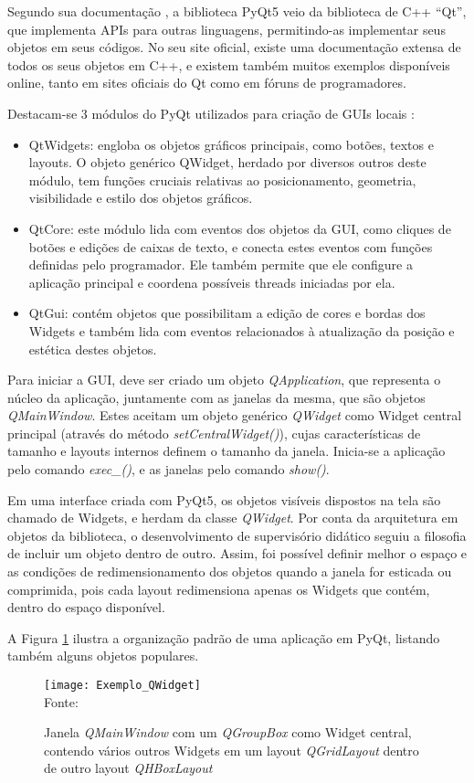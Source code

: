 Segundo sua documentação \cite{pyqtdoc}, a biblioteca PyQt5 veio da biblioteca de C++ “Qt”, que implementa APIs para outras linguagens, permitindo-as implementar seus objetos em seus códigos. No seu site oficial, existe uma documentação extensa de todos os seus objetos em C++, e existem também muitos exemplos disponíveis online, tanto em sites oficiais do Qt como em fóruns de programadores.

Destacam-se 3 módulos do PyQt utilizados para criação de GUIs locais \cite{pyqtdoc}:

\begin{itemize}
	\item QtWidgets: engloba os objetos gráficos principais, como botões, textos e layouts. O objeto genérico QWidget, herdado por diversos outros deste módulo, tem funções cruciais relativas ao posicionamento, geometria, visibilidade e estilo dos objetos gráficos.
	\item QtCore: este módulo lida com eventos dos objetos da GUI, como cliques de botões e edições de caixas de texto, e conecta estes eventos com funções definidas pelo programador. Ele também permite que ele configure a aplicação principal e coordena possíveis threads iniciadas por ela.
	\item QtGui: contém objetos que possibilitam a edição de cores e bordas dos Widgets e também lida com eventos relacionados à atualização da posição e estética destes objetos.
\end{itemize}

Para iniciar a GUI, deve ser criado um objeto \emph{QApplication}, que representa o núcleo da aplicação, juntamente com as janelas da mesma, que são objetos \emph{QMainWindow}. Estes aceitam um objeto genérico \emph{QWidget} como Widget central principal (através do método \emph{setCentralWidget()}), cujas características de tamanho e layouts internos definem o tamanho da janela. Inicia-se a aplicação pelo comando \emph{exec\_()}, e as janelas pelo comando \emph{show()}.

Em uma interface criada com PyQt5, os objetos visíveis dispostos na tela são chamado de Widgets, e herdam da classe \emph{QWidget}. Por conta da arquitetura em objetos da biblioteca, o desenvolvimento de supervisório didático seguiu a filosofia de incluir um objeto dentro de outro. Assim, foi possível definir melhor o espaço e as condições de redimensionamento dos objetos quando a janela for esticada ou comprimida, pois cada layout redimensiona apenas os Widgets que contém, dentro do espaço disponível.

A Figura \ref{img_exemplo_qwidget} ilustra a organização padrão de uma aplicação em PyQt, listando também alguns objetos populares.

\begin{figure}[hbt]
\centering
\caption{Janela \emph{QMainWindow} com um \emph{QGroupBox} como Widget central, contendo vários outros Widgets em um layout \emph{QGridLayout} dentro de outro layout \emph{QHBoxLayout}}
\texttt{[image: Exemplo\_QWidget]} \\
Fonte: 
\label{img_exemplo_qwidget}
\end{figure}
